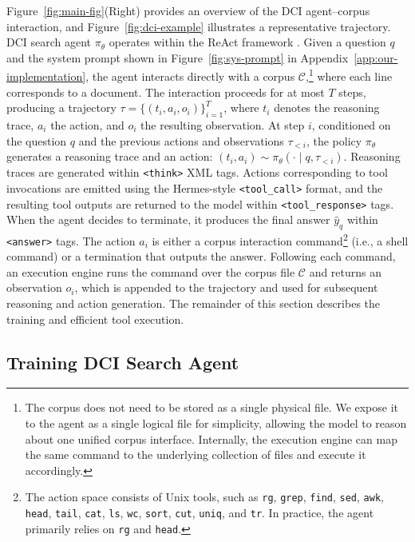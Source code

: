 \documentclass{article} %
\begin{document}
Figure~\ref{fig:main-fig}(Right) provides an overview of the DCI agent--corpus interaction, and Figure~\ref{fig:dci-example} illustrates a representative trajectory. DCI search agent $\pi_{\theta}$ operates within the ReAct framework \citep{yao2023react}. Given a question $q$ and the system prompt shown in Figure~\ref{fig:sys-prompt} in Appendix~\ref{app:our-implementation}, the agent interacts directly with a corpus $\mathcal{C}$,\footnote{The corpus does not need to be stored as a single physical file. We expose it to the agent as a single logical file for simplicity, allowing the model to reason about one unified corpus interface. Internally, the execution engine can map the same command to the underlying collection of files and execute it accordingly.} where each line corresponds to a document. The interaction proceeds for at most $T$ steps, producing a trajectory $\tau = \{(t_i, a_i, o_i)\}_{i=1}^{T}$, where $t_i$ denotes the reasoning trace, $a_i$ the action, and $o_i$ the resulting observation. At step $i$, conditioned on the question $q$ and the previous actions and observations $\tau_{<i}$, the policy $\pi_{\theta}$ generates a reasoning trace and an action: $(t_i, a_i) \sim \pi_{\theta}(\cdot \mid q, \tau_{<i})$. Reasoning traces are generated within \texttt{<think>} XML tags. Actions corresponding to tool invocations are emitted using the Hermes-style \texttt{<tool\_call>} format, and the resulting tool outputs are returned to the model within \texttt{<tool\_response>} tags. When the agent decides to terminate, it produces the final answer $\hat{y}_q$ within \texttt{<answer>} tags. The action $a_i$ is either a corpus interaction command\footnote{The action space consists of Unix tools, such as \texttt{rg}, \texttt{grep}, \texttt{find}, \texttt{sed}, \texttt{awk}, \texttt{head}, \texttt{tail}, \texttt{cat}, \texttt{ls}, \texttt{wc}, \texttt{sort}, \texttt{cut}, \texttt{uniq}, and \texttt{tr}. In practice, the agent primarily relies on \texttt{rg} and \texttt{head}.} (i.e., a shell command) or a termination that outputs the answer. Following each command, an execution engine runs the command over the corpus file $\mathcal{C}$ and returns an observation $o_i$, which is appended to the trajectory and used for subsequent reasoning and action generation. The remainder of this section describes the training and efficient tool execution.

\subsection{Training DCI Search Agent}
\end{document}
